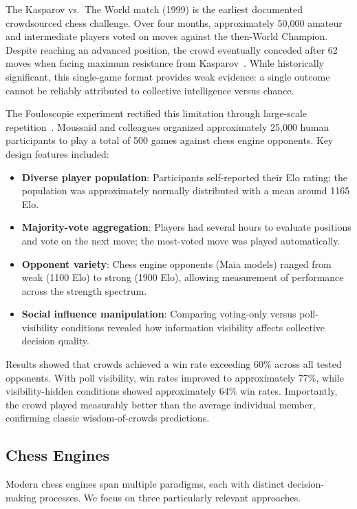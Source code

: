 \documentclass{article}
\begin{document}
The Kasparov vs.\ The World match (1999) is the earliest documented crowdsourced chess challenge.
Over four months, approximately 50,000 amateur and intermediate players voted on moves against the then-World Champion.
Despite reaching an advanced position, the crowd eventually conceded after 62 moves when facing maximum resistance from Kasparov~\cite{kasparov1999}.
While historically significant, this single-game format provides weak evidence: a single outcome cannot be reliably attributed to collective intelligence versus chance.

The Fouloscopie experiment rectified this limitation through large-scale repetition~\cite{moussaid2025}.
Moussaïd and colleagues organized approximately 25,000 human participants to play a total of 500 games against chess engine opponents.
Key design features included:
\begin{itemize}
  \item \textbf{Diverse player population}: Participants self-reported their Elo rating; the population was approximately normally distributed with a mean around 1165 Elo.
  \item \textbf{Majority-vote aggregation}: Players had several hours to evaluate positions and vote on the next move; the most-voted move was played automatically.
  \item \textbf{Opponent variety}: Chess engine opponents (Maia models) ranged from weak (1100 Elo) to strong (1900 Elo), allowing measurement of performance across the strength spectrum.
  \item \textbf{Social influence manipulation}: Comparing voting-only versus poll-visibility conditions revealed how information visibility affects collective decision quality.
\end{itemize}
Results showed that crowds achieved a win rate exceeding 60\% across all tested opponents.
With poll visibility, win rates improved to approximately 77\%, while visibility-hidden conditions showed approximately 64\% win rates.
Importantly, the crowd played measurably better than the average individual member, confirming classic wisdom-of-crowds predictions.

\subsection{Chess Engines}

Modern chess engines span multiple paradigms, each with distinct decision-making processes.
We focus on three particularly relevant approaches.
\end{document}
